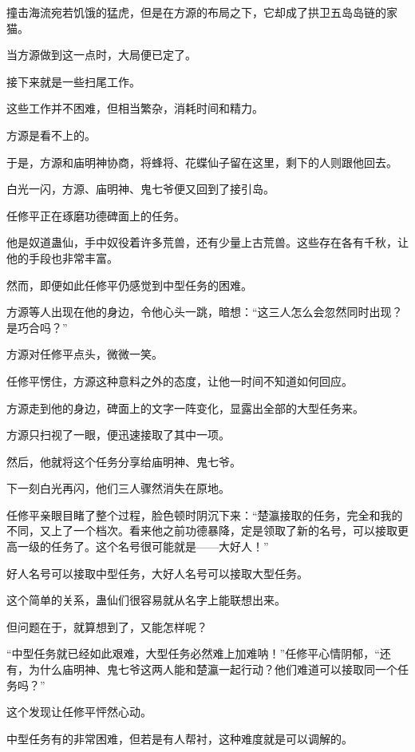 
\begin{this_body}

撞击海流宛若饥饿的猛虎，但是在方源的布局之下，它却成了拱卫五岛岛链的家猫。

当方源做到这一点时，大局便已定了。

接下来就是一些扫尾工作。

这些工作并不困难，但相当繁杂，消耗时间和精力。

方源是看不上的。

于是，方源和庙明神协商，将蜂将、花蝶仙子留在这里，剩下的人则跟他回去。

白光一闪，方源、庙明神、鬼七爷便又回到了接引岛。

任修平正在琢磨功德碑面上的任务。

他是奴道蛊仙，手中奴役着许多荒兽，还有少量上古荒兽。这些存在各有千秋，让他的手段也非常丰富。

然而，即便如此任修平仍感觉到中型任务的困难。

方源等人出现在他的身边，令他心头一跳，暗想：“这三人怎么会忽然同时出现？是巧合吗？”

方源对任修平点头，微微一笑。

任修平愣住，方源这种意料之外的态度，让他一时间不知道如何回应。

方源走到他的身边，碑面上的文字一阵变化，显露出全部的大型任务来。

方源只扫视了一眼，便迅速接取了其中一项。

然后，他就将这个任务分享给庙明神、鬼七爷。

下一刻白光再闪，他们三人骤然消失在原地。

任修平亲眼目睹了整个过程，脸色顿时阴沉下来：“楚瀛接取的任务，完全和我的不同，又上了一个档次。看来他之前功德暴降，定是领取了新的名号，可以接取更高一级的任务了。这个名号很可能就是——大好人！”

好人名号可以接取中型任务，大好人名号可以接取大型任务。

这个简单的关系，蛊仙们很容易就从名字上能联想出来。

但问题在于，就算想到了，又能怎样呢？

“中型任务就已经如此艰难，大型任务必然难上加难呐！”任修平心情阴郁，“还有，为什么庙明神、鬼七爷这两人能和楚瀛一起行动？他们难道可以接取同一个任务吗？”

这个发现让任修平怦然心动。

中型任务有的非常困难，但若是有人帮衬，这种难度就是可以调解的。


\end{this_body}
